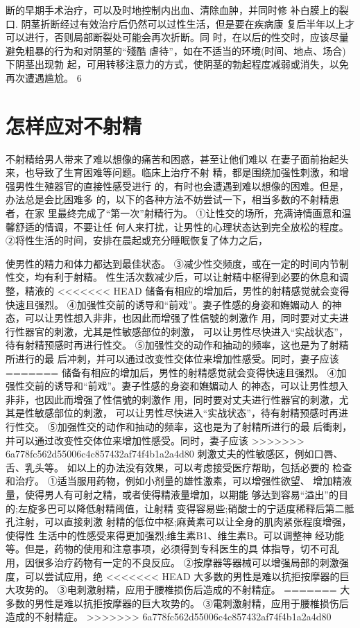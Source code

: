 \documentclass[12pt,UTF8]{ctexbook}
\begin{document}
断的早期手术治疗，可以及时地控制内出血、清除血肿，并同时修
补白膜上的裂口.
阴茎折断经过有效治疗后仍然可以过性生活，但是要在疾病康
复后半年以上才可以进行，否则局部断裂处可能会再次折断。同
时，在以后的性交时，应该尽量避免粗暴的行为和对阴茎的“殘酷
虐待”，如在不适当的环境(时间、地点、场合)下阴茎出现勃
起，可用转移注意力的方式，使阴茎的勃起程度减弱或消失，以免
再次遭遇尴尬。
6
\section{怎样应对不射精}
不射精给男人带来了难以想像的痛苦和困惑，甚至让他们难以
在妻子面前抬起头来，也导致了生育困难等问题。临床上治疗不射
精，都是围绕加强性刺激，和增强男性生殖器官的直接性感受进行
的，有时也会遭遇到难以想像的困难。但是，办法总是会比困难多
的，以下的各种方法不妨尝试一下，相当多数的不射精患者，在家
里最终完成了“第一次”射精行为。
①让性交的场所，充满诗情画意和温馨舒适的情调，不要让任
何人来打扰，让男性的心理状态达到完全放松的程度。
②将性生活的时间，安排在晨起或充分睡眠恢复了体力之后，

使男性的精力和体力都达到最佳状态。
③减少性交频度，或在一定的时间内节制性交，均有利于射精。
性生活次数减少后，可以让射精中枢得到必要的休息和调整，精液的
<<<<<<< HEAD
储备有相应的增加后，男性的射精感觉就会变得快速且强烈。
④加强性交前的诱导和“前戏”。妻子性感的身姿和嫵媚动人
的神态，可以让男性想入非非，也因此而增强了性信號的刺激作
用，同时要对丈夫进行性器官的刺激，尤其是性敏感部位的刺激，
可以让男性尽快进入“实战状态”，待有射精预感时再进行性交。
⑤加强性交的动作和抽动的频率，这也是为了射精所进行的最
后冲刺，并可以通过改变性交体位来增加性感受。同时，妻子应该
=======
储备有相应的增加后，男性的射精感觉就会变得快速且强烈。
④加强性交前的诱导和“前戏”。妻子性感的身姿和嫵媚动人
的神态，可以让男性想入非非，也因此而增强了性信號的刺激作
用，同时要对丈夫进行性器官的刺激，尤其是性敏感部位的刺激，
可以让男性尽快进入“实战状态”，待有射精预感时再进行性交。
⑤加强性交的动作和抽动的频率，这也是为了射精所进行的最
后衝刺，并可以通过改变性交体位来增加性感受。同时，妻子应该
>>>>>>> 6a778fc562d55006c4c857432af74f4b1a2a4d80
刺激丈夫的性敏感区，例如口唇、舌、乳头等。
如以上的办法没有效果，可以考虑接受医疗帮助，包括必要的
检查和治疗。
①适当服用药物，例如小剂量的雄性激素，可以增强性欲望、
增加精液量，使得男人有可射之精，或者使得精液量增加，以期能
够达到容易“溢出”的目的;左旋多巴可以降低射精阈值，让射精
变得容易些;硝酸士的宁适度稀释后第二骶孔注射，可以直接刺激
射精的低位中枢;麻黄素可以让全身的肌肉紧张程度增强，使得性
生活中的性感受来得更加强烈;维生素B1、维生素B。可以调整神
经功能等。但是，药物的使用和注意事项，必须得到专科医生的具
体指导，切不可乱用，因很多治疗药物有一定的不良反应。
②按摩器等器械可以增强局部的刺激强度，可以尝试应用，绝
<<<<<<< HEAD
大多数的男性是难以抗拒按摩器的巨大攻势的。
③电刺激射精，应用于腰椎损伤后造成的不射精症。
=======
大多数的男性是难以抗拒按摩器的巨大攻势的。
③電刺激射精，应用于腰椎损伤后造成的不射精症。
>>>>>>> 6a778fc562d55006c4c857432af74f4b1a2a4d80
\end{document}
